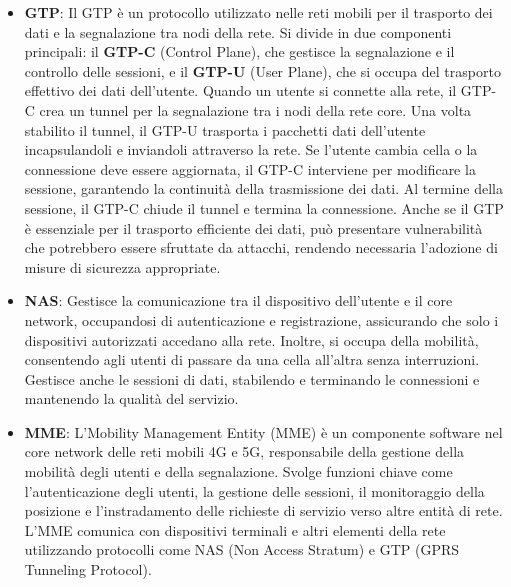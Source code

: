 \documentclass[english]{article}
\begin{document}
\begin{itemize}
	\item \textbf{\hypertarget{GTP}{GTP}}: Il GTP è un protocollo utilizzato
	      nelle reti mobili per il trasporto dei dati e la segnalazione tra nodi della rete.
	      Si divide in due componenti principali: il \textbf{GTP-C} (Control Plane),
	      che gestisce la segnalazione e il controllo delle sessioni, e il
	      \textbf{GTP-U} (User Plane), che si occupa del trasporto
	      effettivo dei dati dell'utente. Quando un utente si connette alla rete,
	      il GTP-C crea un tunnel per la segnalazione tra i nodi della rete core.
	      Una volta stabilito il tunnel, il GTP-U trasporta i pacchetti dati dell'utente
	      incapsulandoli e inviandoli attraverso la rete. Se l'utente cambia cella o la
	      connessione deve essere aggiornata, il GTP-C interviene per modificare la sessione,
	      garantendo la continuità della trasmissione dei dati. Al termine della sessione,
	      il GTP-C chiude il tunnel e termina la connessione. Anche se il GTP è essenziale
	      per il trasporto efficiente dei dati, può presentare vulnerabilità che potrebbero
	      essere sfruttate da attacchi, rendendo necessaria l'adozione di misure di
	      sicurezza appropriate.

	\item \textbf{\hypertarget{NAS}{NAS}}: Gestisce la comunicazione tra il dispositivo dell'utente e il
	      core network, occupandosi di autenticazione e registrazione, assicurando che solo i dispositivi
	      autorizzati accedano alla rete. Inoltre, si occupa della mobilità, consentendo agli utenti di
	      passare da una cella all'altra senza interruzioni. Gestisce anche le sessioni di dati, stabilendo
	      e terminando le connessioni e mantenendo la qualità del servizio.

	\item \textbf{\hypertarget{MME}{MME}}: L'Mobility Management Entity (MME) è un componente software nel
	      core network delle reti mobili 4G e 5G, responsabile della gestione della mobilità degli utenti
	      e della segnalazione. Svolge funzioni chiave come l'autenticazione degli utenti, la gestione
	      delle sessioni,
	      il monitoraggio della posizione e l'instradamento delle richieste di servizio verso
	      altre entità di rete. L'MME comunica con dispositivi terminali e altri elementi
	      della rete utilizzando protocolli come NAS (Non Access Stratum) e
	      GTP (GPRS Tunneling Protocol).
\end{itemize}
\clearpage
\printbibliography
\end{document}
